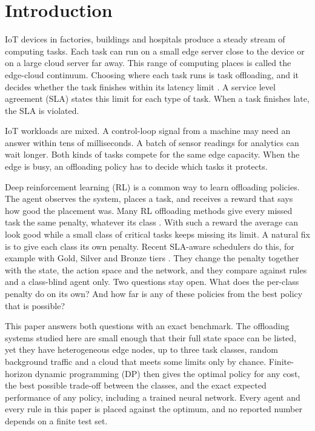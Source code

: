 \section{Introduction}
\label{sec:intro}

IoT devices in factories, buildings and hospitals produce a steady stream of computing tasks. Each task can run on a small edge server close to the device or on a large cloud server far away. This range of computing places is called the edge-cloud continuum. Choosing where each task runs is task offloading, and it decides whether the task finishes within its latency limit \cite{mao2017}. A service level agreement (SLA) states this limit for each type of task. When a task finishes late, the SLA is violated.

IoT workloads are mixed. A control-loop signal from a machine may need an answer within tens of milliseconds. A batch of sensor readings for analytics can wait longer. Both kinds of tasks compete for the same edge capacity. When the edge is busy, an offloading policy has to decide which tasks it protects.

Deep reinforcement learning (RL) \cite{mnih2015,sutton2018} is a common way to learn offloading policies. The agent observes the system, places a task, and receives a reward that says how good the placement was. Many RL offloading methods give every missed task the same penalty, whatever its class \cite{nieto2024}. With such a reward the average can look good while a small class of critical tasks keeps missing its limit. A natural fix is to give each class its own penalty. Recent SLA-aware schedulers do this, for example with Gold, Silver and Bronze tiers \cite{yamsani2026}. They change the penalty together with the state, the action space and the network, and they compare against rules and a class-blind agent only. Two questions stay open. What does the per-class penalty do on its own? And how far is any of these policies from the best policy that is possible?

This paper answers both questions with an exact benchmark. The offloading systems studied here are small enough that their full state space can be listed, yet they have heterogeneous edge nodes, up to three task classes, random background traffic and a cloud that meets some limits only by chance. Finite-horizon dynamic programming (DP) then gives the optimal policy for any cost, the best possible trade-off between the classes, and the exact expected performance of any policy, including a trained neural network. Every agent and every rule in this paper is placed against the optimum, and no reported number depends on a finite test set.


